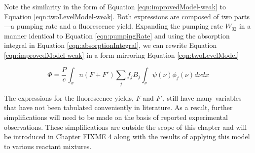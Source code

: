 Note the similarity in the form of Equation \ref{eqn:improvedModel-weak} to Equation \ref{eqn:twoLevelModel-weak}.
Both expressions are composed of two parts---a pumping rate and a fluorescence yield.
Expanding the pumping rate \(W_{02}\) in a manner identical to Equation \ref{eqn:pumpingRate} and using the absorption integral in Equation \ref{eqn:absorptionIntegral}, we can rewrite Equation \ref{eqn:improvedModel-weak} in a form mirroring Equation \ref{eqn:twoLevelModel}

\begin{equation}
  \Phi = \frac{P}{c} \int_x n (F+F') \sum_j f_j B_j \int_\nu \psi(\nu) \phi_j(\nu) d\nu dx
  \label{eqn:improvedModel}
\end{equation}

The expressions for the fluorescence yields, \(F\) and \(F'\), still have many variables that have not been tabulated conveniently in literature.
As a result, further simplifications will need to be made on the basis of reported experimental observations.
These simplifications are outside the scope of this chapter and will be introduced in Chapter FIXME 4 along with the results of applying this model to various reactant mixtures.

